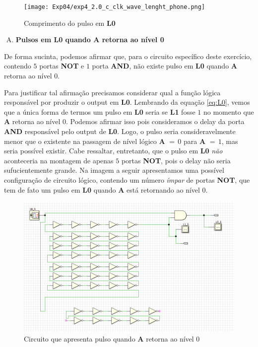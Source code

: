 \documentclass[12pt]{article}
\begin{document}
\begin{figure}[H]
    \centering
    \texttt{[image: Exp04/exp4\_2.0\_c\_clk\_wave\_lenght\_phone.png]}
    \caption{Comprimento do pulso em \textbf{L0}}\label{fig:exp4_2.0_c_clk_wave_lenght_phone.png}
\end{figure}

\begin{enumerate}[D)]
\item \textbf{Pulsos em L0 quando A retorna ao nível 0}
\end{enumerate}

De forma sucinta, podemos afirmar que, para o circuito específico deste
exercício, contendo $5$ portas \textbf{NOT} e $1$ porta \textbf{AND}, não existe
pulso em \textbf{L0} quando \textbf{A} retorna ao nível $0$.

Para justificar tal afirmação precisamos considerar qual a função lógica
responsável por produzir o output em \textbf{L0}. Lembrando da equação
\ref{eq:L0}, vemos que a única forma de termos um pulso em \textbf{L0} seria se
\textbf{L1} fosse $1$ no momento que \textbf{A} retorna ao nível $0$. Podemos
afirmar isso pois consideramos o delay da porta \textbf{AND} responsável pelo
output de \textbf{L0}. Logo, o pulso seria consideravelmente menor que o
existente na passagem de nível lógico \textbf{A} $= \, 0$ para \textbf{A}
$= \, 1$, mas seria possível existir. Cabe ressaltar, entretanto, que o pulso em
\textbf{L0} \emph{não} aconteceria na montagem de apenas $5$ portas
\textbf{NOT}, pois o delay não seria sufucientemente grande. Na imagem a seguir
apresentamos uma possível configuração de circuito lógico, contendo um número
\emph{ímpar} de portas \textbf{NOT}, que tem de fato um pulso em \textbf{L0}
quando \textbf{A} está retornando ao nível $0$.

\begin{figure}[H]
    \centering
    \includegraphics[width=.9\textwidth]{Exp04/exp4_2.0_d_clk_circuito_ao_voltar_para_zero.png}
    \caption{Circuito que apresenta pulso quando \textbf{A} retorna ao nível 0}\label{fig:exp4_2.0_d_clk_circuito_ao_voltar_para_zero.png}
\end{figure}
\end{document}
